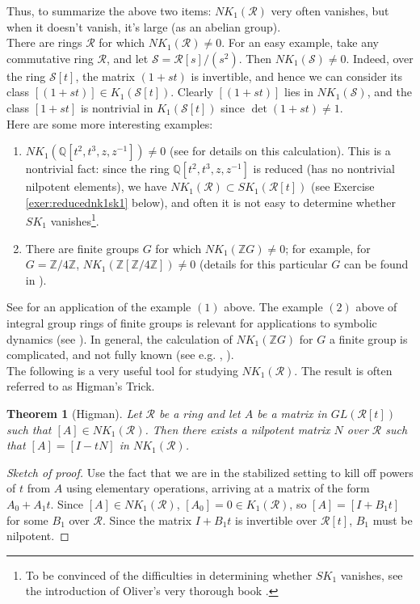 \documentclass{amsart}
\newtheorem{thm}[equation]{Theorem}
\theoremstyle{definition}
\theoremstyle{definition}
\newcommand{\calR}{\mathcal{R}}
\newcommand{\calS}{\mathcal{S}}
\numberwithin{equation}{subsection}
\begin{document}
Thus, to summarize the above two items: $NK_{1}(\calR)$ very often vanishes, but when it doesn't vanish, it's large (as an abelian group).\\

There are rings $\calR$ for which $NK_{1}(\calR) \ne 0$. For an easy example, take any commutative ring $\calR$, and let $\calS = \calR[s] / (s^{2})$. Then $NK_{1}(\calS) \ne 0$. Indeed, over the ring $\calS[t]$, the matrix $(1+st)$ is invertible, and hence we can consider its class $[(1+st)] \in K_{1}(\calS[t])$. Clearly $[(1+st)]$ lies in $NK_{1}(\calS)$, and the class $[1+st]$ is nontrivial in $K_{1}(\calS[t])$ since $\det(1+st) \ne 1$.\\

Here are some more interesting examples:

\begin{enumerate}\label{exa:nk1example}
\item
$NK_{1}(\mathbb{Q}[t^{2},t^{3},z,z^{-1}]) \ne 0$ (see \cite{SchmiedingExamples} for details on this calculation). This is a nontrivial fact: since the ring $\mathbb{Q}[t^{2},t^{3},z,z^{-1}]$ is reduced (has no nontrivial nilpotent elements), we have $NK_{1}(\calR) \subset SK_{1}(\calR[t])$ (see Exercise \ref{exer:reducednk1sk1} below), and often it is not easy to determine whether $SK_{1}$ vanishes\footnote{To be convinced of the difficulties in determining whether $SK_{1}$ vanishes, see the introduction of Oliver's very thorough book \cite{OliverBook}.}.
\item
There are finite groups $G$ for which $NK_{1}(\mathbb{Z}G) \ne 0$; for example, for $G = \mathbb{Z}/4\mathbb{Z}$, $NK_{1}(\mathbb{Z}[\mathbb{Z}/4\mathbb{Z}]) \ne 0$ (details for this particular $G$ can be found in \cite{Weibelnk1calc}).
\end{enumerate}

See \cite{BoSc3} for an application of the example $(1)$ above. The example $(2)$ above of integral group rings of finite groups is relevant for applications to symbolic dynamics (see \cite{BoSc2}). In general, the calculation of $NK_{1}(\mathbb{Z}G)$ for $G$ a finite group is complicated, and not fully known (see e.g. \cite{Harmon1987}, \cite{Weibelnk1calc}).\\

The following is a very useful tool for studying $NK_{1}(\calR)$. The result is often referred to as Higman's Trick.
\begin{thm}[Higman]\label{lemma:higmantrick}
Let $\calR$ be a ring and let $A$ be a matrix in $GL(\calR[t])$ such that $[A] \in NK_{1}(\calR)$. Then there exists a nilpotent matrix $N$ over $\calR$ such that $[A] = [I-tN]$ in $NK_{1}(\calR)$.
\end{thm}
\begin{proof}[Sketch of proof]
Use the fact that we are in the stabilized setting to kill off powers of $t$ from $A$ using elementary operations, arriving at a matrix of the form $A_{0}+A_{1}t$. Since $[A] \in NK_{1}(\calR)$, $[A_{0}] = 0 \in K_{1}(\calR)$, so $[A] = [I+B_{1}t]$ for some $B_{1}$ over $\calR$. Since the matrix $I+B_{1}t$ is invertible over $\calR[t]$, $B_{1}$ must be nilpotent.
\end{proof}
\end{document}
